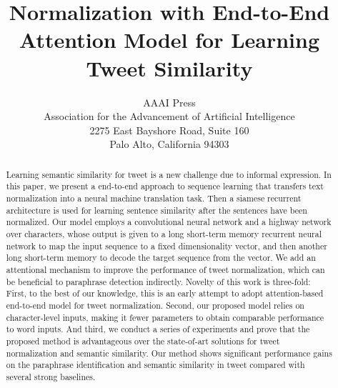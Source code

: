 \documentclass[letterpaper]{article}
\begin{document}
%
\title{Normalization with End-to-End Attention Model for Learning Tweet Similarity}
\author{AAAI Press\\
Association for the Advancement of Artificial Intelligence\\
2275 East Bayshore Road, Suite 160\\
Palo Alto, California 94303\\
}
\maketitle
\begin{abstract}
	Learning semantic similarity for tweet is a new challenge due to informal expression. In this paper, we present a end-to-end approach to sequence learning that transfers text normalization into a neural machine translation task. Then a siamese recurrent architecture is used for learning sentence similarity after the sentences have been normalized. Our model employs a convolutional neural network and a highway network over characters, whose output is given to a long short-term memory recurrent neural network to map the input sequence to a fixed dimensionality vector, and then another long short-term memory to decode the target sequence from the vector. We add an attentional mechanism to improve the performance of tweet normalization, which can be beneficial to paraphrase detection indirectly. Novelty of this work is three-fold: First, to the best of our knowledge, this is an early attempt to adopt attention-based end-to-end model for tweet normalization. Second, our proposed model relies on	character-level inputs, making it fewer parameters to obtain comparable performance to word inputs. And third, we conduct a series of experiments and prove that the proposed method is advantageous over the state-of-art solutions for tweet normalization and semantic similarity. Our method shows significant performance gains on the paraphrase identification and semantic similarity in tweet compared with several strong baselines. 
\end{abstract}
\end{document}

